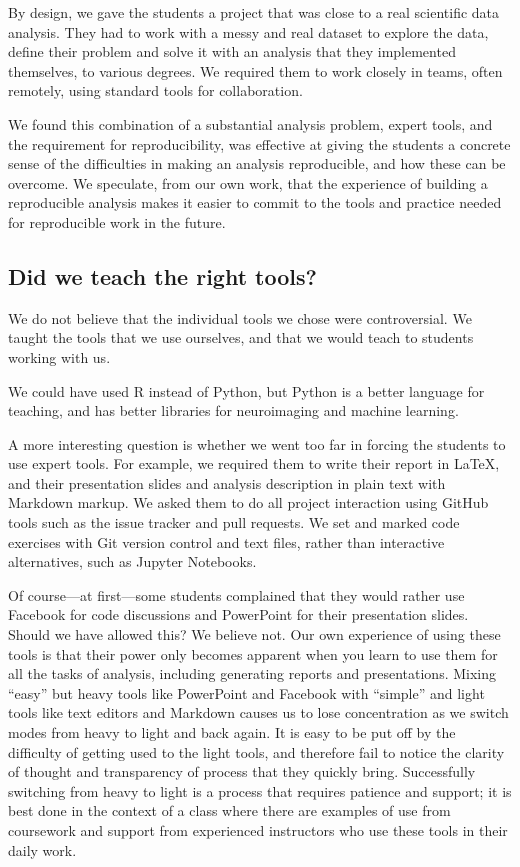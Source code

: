 By design, we gave the students a project that was close to a real
scientific data analysis.  They had to work with a messy and real dataset to
explore the data, define their problem and solve it with an analysis that they
implemented themselves, to various degrees.  We required them to work closely
in teams, often remotely, using standard tools for collaboration.

We found this combination of a substantial analysis problem, expert tools, and
the requirement for reproducibility, was effective at giving the students a
concrete sense of the difficulties in making an analysis reproducible, and how
these can be overcome.  We speculate, from our own work, that the
experience of building a reproducible analysis makes it easier to commit to
the tools and practice needed for reproducible work in the future.

\subsection{Did we teach the right tools?}

We do not believe that the individual tools we chose were controversial. We
taught the tools that we use ourselves, and that we would teach to
students working with us.

We could have used R instead of Python, but Python is a better language for
teaching, and has better libraries for neuroimaging and machine learning.

A more interesting question is whether we went too far in forcing the students
to use expert tools.  For example, we required them to write their
report in \LaTeX, and their presentation slides and analysis description in
plain text with Markdown markup.  We asked them to do all project interaction
using GitHub tools such as the issue tracker and pull requests.  We set and
marked code exercises with Git version control and text files, rather than
interactive alternatives, such as Jupyter Notebooks.

Of course---at first---some students complained that they would rather use
Facebook for code discussions and PowerPoint for their presentation slides.
Should we have allowed this?  We believe not.  Our own experience
of using these tools is that their power only becomes apparent
when you learn to use them for all the tasks of analysis, including generating
reports and presentations.  Mixing ``easy'' but heavy tools like PowerPoint
and Facebook with ``simple'' and light tools like text editors and Markdown
causes us to lose concentration as we switch modes from heavy to light and
back again. It is easy to be put off by the difficulty of getting used to the
light tools, and therefore fail to notice the clarity of thought and
transparency of process that they quickly bring.  Successfully switching from
heavy to light is a process that requires patience and support; it is best
done in the context of a class where there are examples of use from coursework
and support from experienced instructors who use these tools in their daily
work.

